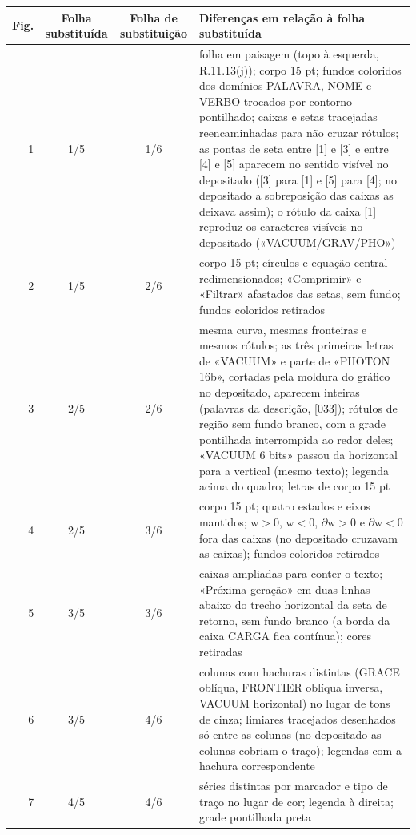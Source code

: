 \documentclass[a4paper,11pt]{article}
\begin{document}
{\small\begin{longtable}{|r|c|c|p{9.4cm}|}\hline \textbf{Fig.} & \textbf{Folha substituída} & \textbf{Folha de substituição} & \textbf{Diferenças em relação à folha substituída}\\\hline\endhead

1 & 1/5 & 1/6 & folha em paisagem (topo à esquerda, R.11.13(j)); corpo 15 pt; fundos coloridos dos domínios PALAVRA, NOME e VERBO trocados por contorno pontilhado; caixas e setas tracejadas reencaminhadas para não cruzar rótulos; as pontas de seta entre [1] e [3] e entre [4] e [5] aparecem no sentido visível no depositado ([3] para [1] e [5] para [4]; no depositado a sobreposição das caixas as deixava assim); o rótulo da caixa [1] reproduz os caracteres visíveis no depositado («VACUUM/GRAV/PHO»)\\\hline

2 & 1/5 & 2/6 & corpo 15 pt; círculos e equação central redimensionados; «Comprimir» e «Filtrar» afastados das setas, sem fundo; fundos coloridos retirados\\\hline

3 & 2/5 & 2/6 & mesma curva, mesmas fronteiras e mesmos rótulos; as três primeiras letras de «VACUUM» e parte de «PHOTON 16b», cortadas pela moldura do gráfico no depositado, aparecem inteiras (palavras da descrição, [033]); rótulos de região sem fundo branco, com a grade pontilhada interrompida ao redor deles; «VACUUM 6 bits» passou da horizontal para a vertical (mesmo texto); legenda acima do quadro; letras de corpo 15 pt\\\hline

4 & 2/5 & 3/6 & corpo 15 pt; quatro estados e eixos mantidos; w$>$0, w$<$0, $\partial$w$>$0 e $\partial$w$<$0 fora das caixas (no depositado cruzavam as caixas); fundos coloridos retirados\\\hline

5 & 3/5 & 3/6 & caixas ampliadas para conter o texto; «Próxima geração» em duas linhas abaixo do trecho horizontal da seta de retorno, sem fundo branco (a borda da caixa CARGA fica contínua); cores retiradas\\\hline

6 & 3/5 & 4/6 & colunas com hachuras distintas (GRACE oblíqua, FRONTIER oblíqua inversa, VACUUM horizontal) no lugar de tons de cinza; limiares tracejados desenhados só entre as colunas (no depositado as colunas cobriam o traço); legendas com a hachura correspondente\\\hline

7 & 4/5 & 4/6 & séries distintas por marcador e tipo de traço no lugar de cor; legenda à direita; grade pontilhada preta\\\hline


\end{longtable}}
\end{document}
